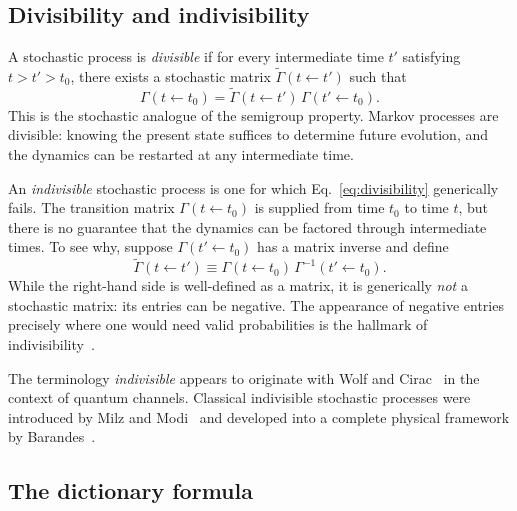 \documentclass[aps,prd,twocolumn,superscriptaddress,nofootinbib]{revtex4-2}
\begin{document}
\subsection{Divisibility and indivisibility}

A stochastic process is \emph{divisible} if for every intermediate time $t'$ satisfying $t > t' > t_0$, there exists a stochastic matrix $\tilde{\Gamma}(t \leftarrow t')$ such that
\begin{equation}
\Gamma(t \leftarrow t_0) = \tilde{\Gamma}(t \leftarrow t')\, \Gamma(t' \leftarrow t_0).
\label{eq:divisibility}
\end{equation}
This is the stochastic analogue of the semigroup property. Markov processes are divisible: knowing the present state suffices to determine future evolution, and the dynamics can be restarted at any intermediate time.

An \emph{indivisible} stochastic process is one for which Eq.~\eqref{eq:divisibility} generically fails. The transition matrix $\Gamma(t \leftarrow t_0)$ is supplied from time $t_0$ to time $t$, but there is no guarantee that the dynamics can be factored through intermediate times. To see why, suppose $\Gamma(t' \leftarrow t_0)$ has a matrix inverse and define
\begin{equation}
\tilde{\Gamma}(t \leftarrow t') \equiv \Gamma(t \leftarrow t_0)\, \Gamma^{-1}(t' \leftarrow t_0).
\label{eq:attempted_division}
\end{equation}
While the right-hand side is well-defined as a matrix, it is generically \emph{not} a stochastic matrix: its entries can be negative. The appearance of negative entries precisely where one would need valid probabilities is the hallmark of indivisibility~\cite{WolfCirac2008,MilzModi2021,Barandes2025SQC}.

The terminology \emph{indivisible} appears to originate with Wolf and Cirac~\cite{WolfCirac2008} in the context of quantum channels. Classical indivisible stochastic processes were introduced by Milz and Modi~\cite{MilzModi2021} and developed into a complete physical framework by Barandes~\cite{Barandes2025SQC,Barandes2025SQT}.

\subsection{The dictionary formula}
\end{document}
